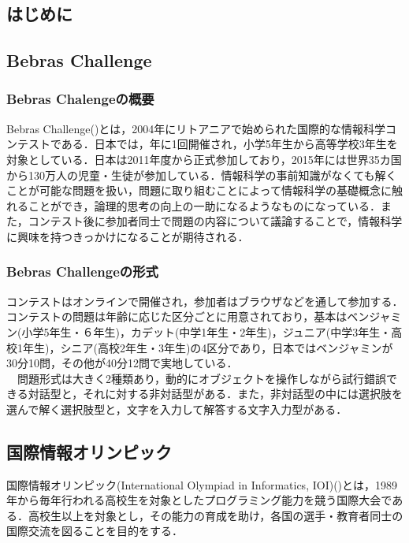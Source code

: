 \documentclass[a4paper]{jarticle}
\begin{document}
\maketitle
\begin{multicols}{2}
\setcounter{page}{1}

\section{はじめに}

\subsection{Bebras Challenge}
\subsubsection{Bebras Chalengeの概要}
Bebras Challenge(\cite{bebras-contest, bebras-pdf})とは，2004年にリトアニアで始められた国際的な情報科学コンテストである．日本では，年に1回開催され，小学5年生から高等学校3年生を対象としている．日本は2011年度から正式参加しており，2015年には世界35カ国から130万人の児童・生徒が参加している．情報科学の事前知識がなくても解くことが可能な問題を扱い，問題に取り組むことによって情報科学の基礎概念に触れることができ，論理的思考の向上の一助になるようなものになっている．また，コンテスト後に参加者同士で問題の内容について議論することで，情報科学に興味を持つきっかけになることが期待される．

\subsubsection{Bebras Challengeの形式}
 コンテストはオンラインで開催され，参加者はブラウザなどを通して参加する．コンテストの問題は年齢に応じた区分ごとに用意されており，基本はベンジャミン(小学5年生・６年生)，カデット(中学1年生・2年生)，ジュニア(中学3年生・高校1年生)，シニア(高校2年生・3年生)の4区分であり，日本ではベンジャミンが30分10問，その他が40分12問で実地している．
\\　問題形式は大きく2種類あり，動的にオブジェクトを操作しながら試行錯誤できる対話型と，それに対する非対話型がある．また，非対話型の中には選択肢を選んで解く選択肢型と，文字を入力して解答する文字入力型がある．

\subsection{国際情報オリンピック}
国際情報オリンピック(International Olympiad in Informatics, IOI)(\cite{ioi})とは，1989年から毎年行われる高校生を対象としたプログラミング能力を競う国際大会である．高校生以上を対象とし，その能力の育成を助け，各国の選手・教育者同士の国際交流を図ることを目的をする．

\end{multicols}
\end{document}
